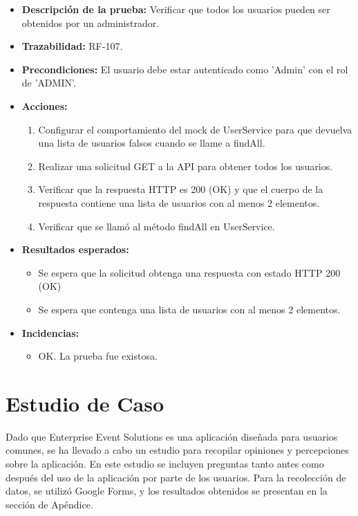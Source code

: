 \begin{itemize}
    \item \textbf{Descripción de la prueba:} Verificar que todos los usuarios pueden ser obtenidos por un administrador.
    \item \textbf{Trazabilidad:} RF-107.
    \item \textbf{Precondiciones:} El usuario debe estar autenticado como 'Admin' con el rol de 'ADMIN'.
    \item \textbf{Acciones:}
    \begin{enumerate}
        \item Configurar el comportamiento del mock de UserService para que devuelva una lista de usuarios falsos cuando se llame a findAll.
        \item Realizar una solicitud GET a la API para obtener todos los usuarios.
        \item Verificar que la respuesta HTTP es 200 (OK) y que el cuerpo de la respuesta contiene una lista de usuarios con al menos 2 elementos.
        \item Verificar que se llamó al método findAll en UserService.
    \end{enumerate}
    \item \textbf{Resultados esperados:}
    \begin{itemize}
        \item Se espera que la solicitud obtenga una respuesta con estado HTTP 200 (OK) 
        \item Se espera que contenga una lista de usuarios con al menos 2 elementos.
    \end{itemize}
    \item \textbf{Incidencias:}
    \begin{itemize}
        \item OK. La prueba fue existosa.
    \end{itemize}
\end{itemize}

\section{Estudio de Caso}
Dado que Enterprise Event Solutions es una aplicación diseñada para usuarios comunes, se ha llevado a cabo un estudio para recopilar opiniones y percepciones
 sobre la aplicación. En este estudio se incluyen preguntas tanto antes como después del uso de la aplicación por parte de los usuarios. Para la recolección de datos, 
 se utilizó Google Forms, y los resultados obtenidos se presentan en la sección de Apéndice.

